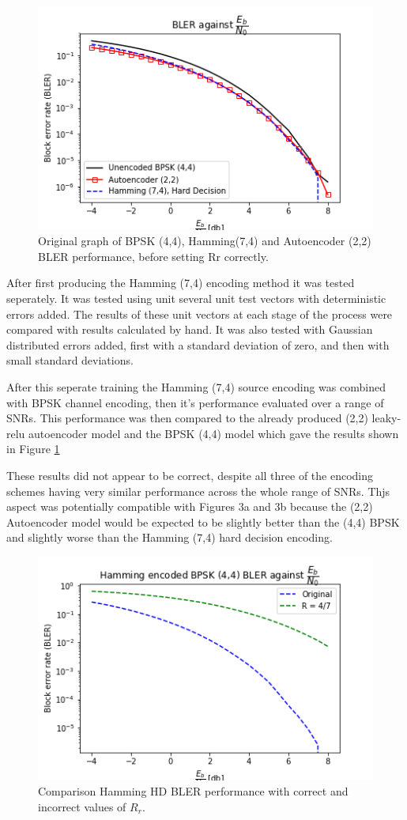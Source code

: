 \documentclass[12pt,onecolumn,letterpaper]{article}
\begin{document}
\begin{figure}
   \centering
   \includegraphics[width=0.6\linewidth]{figures/bler_vs_eb_only_three.png}
   \caption{Original graph of BPSK (4,4), Hamming(7,4) and Autoencoder (2,2) BLER performance, before setting Rr correctly.}
   \label{fig:BlerOriginalHammingBpskAe22}
\end{figure}

After first producing the Hamming (7,4) encoding method it was tested seperately. It was tested using unit several unit test vectors with deterministic errors added. The results of these unit vectors at each stage of the process were compared with results calculated by hand. It was also tested with Gaussian distributed errors added, first with a standard deviation of zero, and then with small standard deviations.

After this seperate training the Hamming (7,4) source encoding was combined with BPSK channel encoding, then it's performance evaluated over a range of SNRs. This performance was then compared to the already produced (2,2) leaky-relu autoencoder model and the BPSK (4,4) model which gave the results shown in Figure \ref{fig:BlerOriginalHammingBpskAe22}


These results did not appear to be correct, despite all three of the encoding schemes having very similar performance across the whole range of SNRs. Thjs aspect was potentially compatible with Figures 3a and 3b because the (2,2) Autoencoder model would be expected to be slightly better than the (4,4) BPSK and slightly worse than the Hamming (7,4) hard decision encoding.

\begin{figure}
   \centering
   \includegraphics[width=0.6\linewidth]{figures/hamming_correct_Rr_comparison.png}
   \caption{Comparison Hamming HD BLER performance with correct and incorrect values of $R_r$.}
   \label{fig:HammingCorrectRrComp}
\end{figure}
\end{document}
